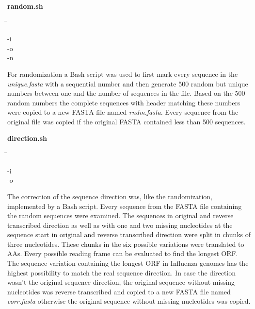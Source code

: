    \begin{leftbar}
        \textbf{random.sh}
        \begin{nstabbing}
            \qquad \= \kill
        
            -i \\
        
            -o \\
            
            -n 
        \end{nstabbing}
    \end{leftbar}
    
    For randomization a Bash script was used to first mark every sequence in the \textit{unique.fasta} with a sequential number and then generate 500 random but unique numbers between one and the number of sequences in the file. Based on the 500 random numbers the complete sequences with header matching these numbers were copied to a new FASTA file named \textit{rndm.fasta}. Every sequence from the original file was copied if the original FASTA contained less than 500 sequences. 
    
    \begin{leftbar}
        \textbf{direction.sh}
        \begin{nstabbing}
            \qquad \= \kill
        
            -i \\
        
            -o 
        \end{nstabbing}
    \end{leftbar}
    
    The correction of the sequence direction was, like the randomization, implemented by a Bash script. Every sequence from the FASTA file containing the random sequences were examined. The sequences in original and reverse transcribed direction as well as with one and two missing nucleotides at the sequence start in original and reverse transcribed direction were split in chunks of three nucleotides. These chunks in the six possible variations were translated to \glspl{AA}. Every possible reading frame can be evaluated to find the longest \gls{ORF}. The sequence variation containing the longest \gls{ORF} in Influenza genomes has the highest possibility to match the real sequence direction. In case the direction wasn't the original sequence direction, the original sequence without missing nucleotides was reverse transcribed and copied to a new FASTA file named \textit{corr.fasta} otherwise the original sequence without missing nucleotides was copied.
    
